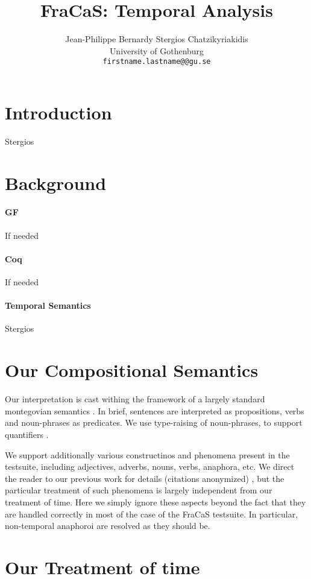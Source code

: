 \documentclass[a4paper,11pt]{article}
\title{FraCaS: Temporal Analysis}
\author{Jean-Philippe Bernardy \qquad Stergios Chatzikyriakidis \\
  University of Gothenburg\\
  {\tt firstname.lastname@@gu.se} \\}
\date{}
\begin{document}
\maketitle

\section{Introduction}
Stergios
\section{Background}
\paragraph{GF}
If needed
\paragraph{Coq}
If needed
\paragraph{Temporal Semantics}
Stergios
 
\section{Our Compositional Semantics}

Our interpretation is cast withing the framework of a largely standard
montegovian semantics \cite{todo}. In brief, sentences are interpreted as
propositions, verbs and noun-phrases as predicates.  We use
type-raising of noun-phrases, to support quantifiers \cite{PTQ}.

We support additionally various constructinos and phenomena present in
the testsuite, including adjectives, adverbs, nouns, verbs, anaphora,
etc. We direct the reader to our previous work for details \ifanon
(citations anonymized) \else \citet{bernardy_type_2017,bernardy_wide_2019} \fi, but the particular
treatment of such phenomena is largely independent from our treatment
of time.
%
Here we simply ignore these aspects beyond the fact that they
are handled correctly in most of the case of the FraCaS testsuite.  In
particular, non-temporal anaphoroi are resolved as they should be.

\section{Our Treatment of time}
\end{document}
